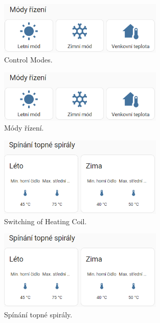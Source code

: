 \begin{English}
\begin{figure}[H]
    \centering
    \includegraphics[width=0.7\textwidth]{pictures/czech/software/control-modes.png}
    \caption{Control Modes.}
    \label{fig:control-modes}
\end{figure}
\end{English}

\begin{Czech}
\begin{figure}[H]
    \centering
    \includegraphics[width=0.7\textwidth]{pictures/czech/software/control-modes.png}
    \caption{Módy řízení.}
    \label{fig:control-modes}
\end{figure}
\end{Czech}


\begin{English}
\begin{figure}[H]
    \centering
    \includegraphics[width=0.7\textwidth]{pictures/czech/software/switching-heating-coil.png}
    \caption{Switching of Heating Coil.}
    \label{fig:switching-heating-coil}
\end{figure}
\end{English}

\begin{Czech}
\begin{figure}[H]
    \centering
    \includegraphics[width=0.7\textwidth]{pictures/czech/software/switching-heating-coil.png}
    \caption{Spínání topné spirály.}
    \label{fig:switching-heating-coil}
\end{figure}
\end{Czech}


